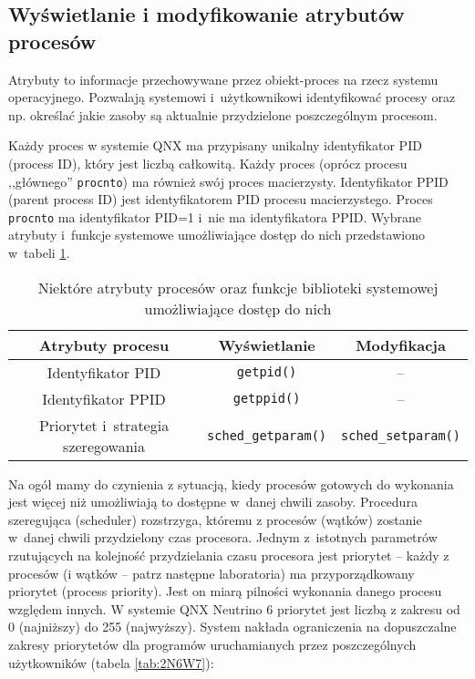 \subsection{Wyświetlanie i modyfikowanie atrybutów procesów}

Atrybuty to informacje przechowywane przez obiekt-proces na rzecz systemu
operacyjnego. Pozwalają systemowi i~użytkownikowi identyfikować procesy oraz
np. określać jakie zasoby są aktualnie przydzielone poszczególnym procesom.

Każdy proces w systemie QNX ma przypisany unikalny identyfikator PID (process
ID), który jest liczbą całkowitą. Każdy proces (oprócz procesu ,,głównego''
\texttt{procnto}) ma również swój proces macierzysty. Identyfikator PPID
(parent process ID) jest identyfikatorem PID procesu macierzystego. Proces
\texttt{procnto} ma identyfikator PID=1 i~nie ma identyfikatora PPID. Wybrane
atrybuty i~funkcje systemowe umożliwiające dostęp do nich przedstawiono
w~tabeli \ref{tab:HE6LE}.

\begin{table}[h!]
  \centering
  \caption{Niektóre atrybuty procesów oraz funkcje biblioteki systemowej
           umożliwiające dostęp do nich}
  \label{tab:HE6LE}
  \begin{tabular}{|c|c|c|}
    \hline
    \textbf{Atrybuty procesu} & \textbf{Wyświetlanie} & \textbf{Modyfikacja} \\ \hline
    Identyfikator PID                   & \texttt{getpid()}           & -- \\ \hline
    Identyfikator PPID                  & \texttt{getppid()}          & -- \\ \hline
    Priorytet i~strategia szeregowania  & \texttt{sched\_getparam()}  & \texttt{sched\_setparam()} \\ \hline
  \end{tabular}
\end{table}

Na ogół mamy do czynienia z sytuacją, kiedy procesów gotowych do wykonania jest
więcej niż umożliwiają to dostępne w~danej chwili zasoby. Procedura szeregująca
(scheduler) rozstrzyga, któremu z procesów (wątków) zostanie w~danej chwili
przydzielony czas procesora. Jednym z~istotnych parametrów rzutujących na
kolejność przydzielania czasu procesora jest priorytet -- każdy z procesów (i
wątków -- patrz następne laboratoria) ma przyporządkowany priorytet (process
priority).  Jest on miarą pilności wykonania danego procesu względem innych.
W systemie QNX Neutrino 6 priorytet jest liczbą z zakresu od 0 (najniższy) do
255 (najwyższy). System nakłada ograniczenia na dopuszczalne zakresy
priorytetów dla programów uruchamianych przez poszczególnych użytkowników
(tabela \ref{tab:2N6W7}):

